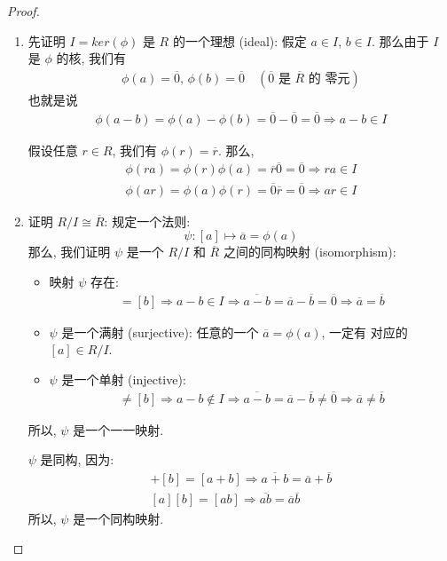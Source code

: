 \documentclass[utf8]{ctexbook}
\theoremstyle{definition}
\begin{document}
\begin{proof}
\begin{enumerate}
\item{先证明 $I=ker(\phi)$ 是 $R$ 的一个理想 (ideal): 假定 $a \in I$, $b \in I$. 那么由于 $I$ 是 $\phi$ 的核, 我们有
\begin{align*}
\phi(a) =  \overline{0}, \, \phi(b) = \overline{0} \quad (\overline{0} \mbox{ 是 $\overline{R}$ 的 零元})
\end{align*}
也就是说 
\begin{align*}
\phi(a-b) = \phi(a) - \phi(b) =  \overline{0} - \overline{0} = \overline{0} \Longrightarrow a - b \in I
\end{align*}

假设任意 $r \in R$, 我们有 $\phi(r) = \overline{r}$. 那么,
\begin{align*}
\phi(ra) = \phi(r) \phi(a) =  \overline{r} \overline{0} = \overline{0} \Longrightarrow ra \in I \\
\phi(ar) = \phi(a) \phi(r) = \overline{0} \overline{r} = \overline{0} \Longrightarrow ar \in I
\end{align*}
}
\item{证明 $R/I \cong \overline{R}$: 规定一个法则:
\begin{equation}
\psi : [a] \mapsto \overline{a} = \phi(a)
\end{equation}
那么, 我们证明 $\psi$ 是一个 $R/I$ 和 $\overline{R}$ 之间的同构映射 (isomorphism):
\begin{itemize}
\item{映射 $\psi$ 存在: 
\begin{align*}
[a] = [b] \Longrightarrow a - b \in I \Longrightarrow \overline{a - b} = \overline{a} - \overline{b} = \overline{0} \Longrightarrow \overline{a} = \overline{b} 
\end{align*}
}
\item{$\psi$ 是一个满射 (surjective):
任意的一个 $\overline{a} = \phi(a)$, 一定有 对应的 $[a] \in R/I$.
}
\item{$\psi$ 是一个单射 (injective):
\begin{align*}
[a] \neq [b] \Longrightarrow a - b \not \in I \Longrightarrow \overline{a - b} = \overline{a} - \overline{b} \neq \overline{0} \Longrightarrow \overline{a} \neq \overline{b} 
\end{align*}
}
\end{itemize}

所以, $\psi$ 是一个一一映射. 

$\psi$ 是同构, 因为:
\begin{align*}
[a] + [b] = [a+b] \Longrightarrow \overline{a+b} = \overline{a} + \overline{b} \\
[a][b] = [ab] \Longrightarrow \overline{ab} = \overline{a} \overline{b}
\end{align*}
所以, $\psi$ 是一个同构映射.
}
\end{enumerate}
\end{proof}
\end{document}
